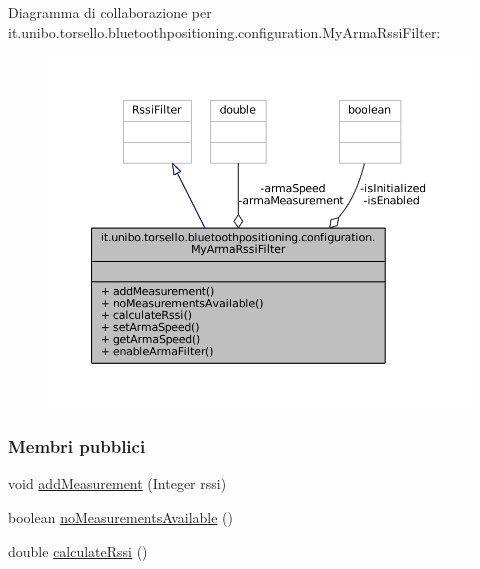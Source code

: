 Diagramma di collaborazione per it.\+unibo.\+torsello.\+bluetoothpositioning.\+configuration.\+My\+Arma\+Rssi\+Filter\+:
\nopagebreak
\begin{figure}[H]
\begin{center}
\leavevmode
\includegraphics[width=350pt]{classit_1_1unibo_1_1torsello_1_1bluetoothpositioning_1_1configuration_1_1MyArmaRssiFilter__coll__graph}
\end{center}
\end{figure}
\subsubsection*{Membri pubblici}
\begin{DoxyCompactItemize}
\item 
void \hyperlink{classit_1_1unibo_1_1torsello_1_1bluetoothpositioning_1_1configuration_1_1MyArmaRssiFilter_ad35f023bd49df5d11db274ad6a900072_ad35f023bd49df5d11db274ad6a900072}{add\+Measurement} (Integer rssi)
\item 
boolean \hyperlink{classit_1_1unibo_1_1torsello_1_1bluetoothpositioning_1_1configuration_1_1MyArmaRssiFilter_a822204c28f67229cabce721dd39d8cf6_a822204c28f67229cabce721dd39d8cf6}{no\+Measurements\+Available} ()
\item 
double \hyperlink{classit_1_1unibo_1_1torsello_1_1bluetoothpositioning_1_1configuration_1_1MyArmaRssiFilter_afcb40e796f16bc1352d34567e8984a87_afcb40e796f16bc1352d34567e8984a87}{calculate\+Rssi} ()
\end{DoxyCompactItemize}
